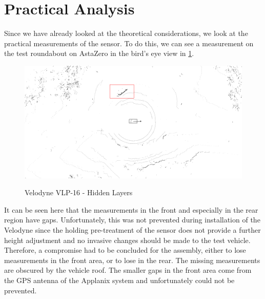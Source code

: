 \documentclass[11pt,oneside,openright]{mpreport}
\begin{document}
\section{Practical Analysis}

Since we have already looked at the theoretical considerations, we look at the practical measurements of the sensor.
To do this, we can see a measurement on the test roundabout on AstaZero in the bird's eye view in \cref{velodyne_hidden}.

\begin{figure}[!ht]
\caption{Velodyne VLP-16 - Hidden Layers}
\includegraphics[width=\textwidth]{bilder/velodyne_back.png}
\label{velodyne_hidden}
\end{figure}


It can be seen here that the measurements in the front and especially in the rear region have gaps. Unfortunately, this was not prevented during installation of the Velodyne since 
the holding pre-treatment of the sensor does not provide a further height adjustment and no invasive changes should be made to the test vehicle. 
Therefore, a compromise had to be concluded for the assembly, either to lose measurements in the front area, or to lose in the rear.
The missing measurements are obscured by the vehicle roof. The smaller gaps in the front area come from the GPS antenna of the Applanix system and unfortunately could not be prevented.
\end{document}
